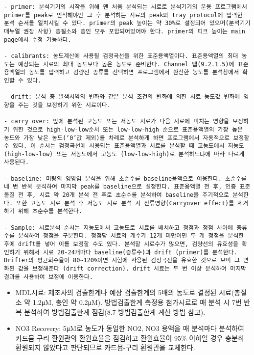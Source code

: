 \documentclass[
]{book}
\begin{document}
\begin{verbatim}
- primer: 분석기기의 시작을 위해 맨 처음 분석되는 시료로 분석기기의 운용 프로그램에서 primer를 peak로 인식해야만 그 후 분석하는 시료의 peak와 tray protocol에 입력한 분석 순서를 일치시킬 수 있다. primer의 peak 높이는 약 30%로 설정되어 있으며(분석기기 매뉴얼 권장 사항) 총질소와 총인 모두 포함되어있어야 한다. primer의 피크 높이는 main page에서 수정 가능하다. 

- calibrants: 농도계산에 사용될 검정곡선을 위한 표준용액열이다. 표준용액열의 최대 농도는 예상되는 시료의 최대 농도보다 높은 농도로 준비한다. Channel 탭(9.2.1.5)에 표준용액열의 농도를 입력하고 검량선 종류를 선택하면 프로그램에서 환산한 농도를 분석창에서 확인할 수 있다.

- drift: 분석 중 발색시약의 변화와 같은 분석 조건의 변화에 의한 시료 농도값 변화에 영향을 주는 것을 보정하기 위한 시료이다. 

- carry over: 앞에 분석된 고농도 또는 저농도 시료가 다음 시료에 미치는 영향을 보정하기 위한 것으로 high-low-low순서 또는 low-low-high 순으로 표준용액열의 가장 높은 농도와 가장 낮은 농도(‘0’값 제외)를 차례로 분석하게 하면 프로그램에서 자동적으로 보정할 수 있다. 이 순서는 검정곡선에 사용되는 표준용액열과 시료를 분석할 때 고농도에서 저농도 (high-low-low) 또는 저농도에서 고농도 (low-low-high)로 분석하느냐에 따라 다르게 사용된다.

- baseline: 미량의 영양염 분석을 위해 초순수를 baseline용액으로 이용한다. 초순수를 네 번 반복 분석하여 마지막 peak를 baseline으로 설정한다. 표준용액열 전 후, 인증 표준물질 전 후, 시료 약 20개 분석 전 후로 초순수를 분석하여 baseline을 주기적으로 분석한다. 또한 고농도 시료 분석 후 저농도 시료 분석 시 잔류영향(Carryover effect)를 제거하기 위해 초순수를 분석한다.

- Sample: 시료분석 순서는 저농도에서 고농도로 시료를 배치하고 정점과 정점 사이에 증류수를 분석하여 정점을 구분한다. 정점당 시료의 개수가 12개 미만이면 두 개 정점을 분석한 후에 drift를 넣어 이를 보정할 수도 있다. 분석할 시료수가 많으면, 검량선의 유효성을 확인하기 위해서 시료 20-24개마다 baseline(증류수)과 drift (primer)를 분석한다. Drifter의 평균회수율이 80~120%이면 시험에 사용된 검정곡선을 유효한 것으로 보며 그 변화된 값을 보정해준다 (drift correction). drift 시료는 두 번 이상 분석하여 마지막 결과를 사용하여 보정에 이용한다.
\end{verbatim}

\begin{itemize}
\item
  MDL시료: 제조사의 검출한계나 예상 검출한계의 5배의 농도로 결정된 시료(총질소 약 1.2μM, 총인 약 0.2μM). 방법검출한계 측정용 첨가시료로 매 분석 시 7번 반복 분석하여 방법검출한계 점검(8.7 방법검출한계 계산 방법 참고).
\item
  NO3 Recovery: 5μM로 농도가 동일한 NO2, NO3 용액을 매 분석마다 분석하여 카드뮴-구리 환원관의 환원효율을 점검하고 환원효율이 95\% 이하일 경우 충분히 환원되지 않았다고 판단되므로 카드뮴-구리 환원관을 교체한다.
\end{itemize}
\end{document}
